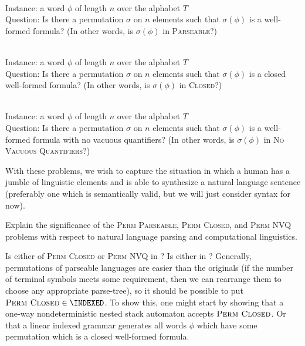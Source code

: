 \documentclass{article}
\newcommand{\CLOSED}{\textsc{Closed}}
\newcommand{\PARSEABLE}{\textsc{Parseable}}
\newcommand{\NVQ}{\textsc{No Vacuous Quantifiers}}
\newcommand{\pp}{\textsc{Perm Parseable}}
\newcommand{\pc}{\textsc{Perm Closed}}
\newcommand{\pn}{\textsc{Perm NVQ}}
\newenvironment{langdef}[1]{\begin{definition}[#1]\mbox{}}{\end{definition}}
\newenvironment{instance}{\\Instance:}{}
\newenvironment{question}{\\Question:}{}
\begin{document}
\begin{langdef}{\pp}
  \begin{instance}
    a word $\phi$ of length $n$ over the alphabet $T$
  \end{instance}
  \begin{question}
    Is there a permutation $\sigma$ on $n$ elements such that $\sigma(\phi)$ is a well-formed formula?
    (In other words, is $\sigma(\phi)$ in \PARSEABLE?)
  \end{question}
\end{langdef}

\begin{langdef}{\pc}
  \begin{instance}
    a word $\phi$ of length $n$ over the alphabet $T$
  \end{instance}
  \begin{question}
    Is there a permutation $\sigma$ on $n$ elements such that $\sigma(\phi)$ is a closed well-formed formula?
    (In other words, is $\sigma(\phi)$ in \CLOSED?)
  \end{question}
\end{langdef}

\begin{langdef}{\pn}
  \begin{instance}
    a word $\phi$ of length $n$ over the alphabet $T$
  \end{instance}
  \begin{question}
    Is there a permutation $\sigma$ on $n$ elements such that $\sigma(\phi)$ is a well-formed formula with no vacuous quantifiers?
    (In other words, is $\sigma(\phi)$ in \NVQ?)
  \end{question}
\end{langdef}

With these problems, we wish to capture the situation in which a human has a jumble of linguistic elements and is able to synthesize a natural language sentence (preferably one which is semantically valid, but we will just consider syntax for now).

\begin{todo}
  Explain the significance of the \pp, \pc, and \pn{} problems with respect to natural language parsing and computational linguistics.
\end{todo}

\begin{openproblem}
  Is either of \pc{} or \pn{} in \INDEXED?
  Is either in \MCSL?
  Generally, permutations of parseable languages are easier than the originals (if the number of terminal symbols meets some requirement, then we can rearrange them to choose any appropriate parse-tree), so it should be possible to put $\pc \in \INDEXED$.
  To show this, one might start by showing that a one-way nondeterministic nested stack automaton accepts $\pc$.
  Or that a linear indexed grammar generates all words $\phi$ which have some permutation which is a closed well-formed formula.
\end{openproblem}
\end{document}
